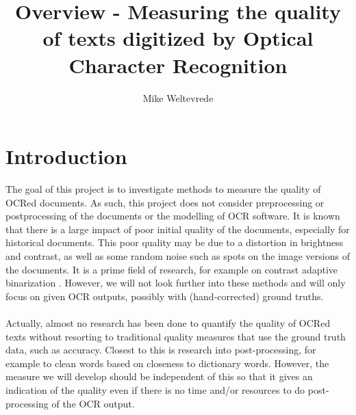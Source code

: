 \documentclass{article}
\title{Overview - Measuring the quality of texts digitized by Optical Character Recognition}
\author{Mike Weltevrede}
\begin{document}
	
	\maketitle
	
	\tableofcontents
	
	\section{Introduction}
	The goal of this project is to investigate methods to measure the quality of OCRed documents. As such, this project does not consider preprocessing or postprocessing of the documents or the modelling of OCR software. It is known that there is a large impact of poor initial quality of the documents, especially for historical documents. This poor quality may be due to a distortion in brightness and contrast, as well as some random noise such as spots on the image versions of the documents. It is a prime field of research, for example on contrast adaptive binarization \cite{feng2004contrast}. However, we will not look further into these methods and will only focus on given OCR outputs, possibly with (hand-corrected) ground truths.
	\\ \\
	Actually, almost no research has been done to quantify the quality of OCRed texts without resorting to traditional quality measures that use the ground truth data, such as accuracy. Closest to this is research into post-processing, for example to clean words based on closeness to dictionary words. However, the measure we will develop should be independent of this so that it gives an indication of the quality even if there is no time and/or resources to do post-processing of the OCR output.
	
\end{document}
